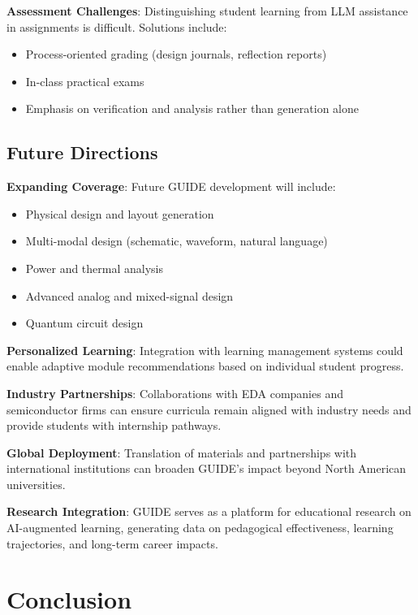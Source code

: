 \documentclass[10pt,conference]{IEEEtran}
\begin{document}
\textbf{Assessment Challenges}: Distinguishing student learning from LLM assistance in assignments is difficult. Solutions include:
\begin{itemize}
    \item Process-oriented grading (design journals, reflection reports)
    \item In-class practical exams
    \item Emphasis on verification and analysis rather than generation alone
\end{itemize}

\subsection{Future Directions}

\textbf{Expanding Coverage}: Future GUIDE development will include:
\begin{itemize}
    \item Physical design and layout generation
    \item Multi-modal design (schematic, waveform, natural language)
    \item Power and thermal analysis
    \item Advanced analog and mixed-signal design
    \item Quantum circuit design
\end{itemize}

\textbf{Personalized Learning}: Integration with learning management systems could enable adaptive module recommendations based on individual student progress.

\textbf{Industry Partnerships}: Collaborations with EDA companies and semiconductor firms can ensure curricula remain aligned with industry needs and provide students with internship pathways.

\textbf{Global Deployment}: Translation of materials and partnerships with international institutions can broaden GUIDE's impact beyond North American universities.

\textbf{Research Integration}: GUIDE serves as a platform for educational research on AI-augmented learning, generating data on pedagogical effectiveness, learning trajectories, and long-term career impacts.

\section{Conclusion}
\label{sec:conclusion}
\end{document}
